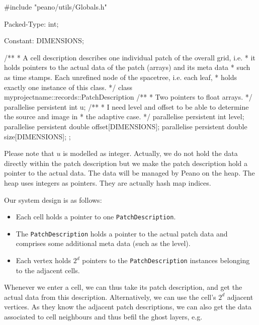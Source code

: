 \begin{code}
#include "peano/utils/Globals.h"

Packed-Type:  int;

Constant: DIMENSIONS;

/**
 * A cell description describes one individual patch of the overall grid, i.e. 
 * it holds pointers to the actual data of the patch (arrays) and its meta data
 * such as time stamps. Each unrefined node of the spacetree, i.e. each leaf, 
 * holds exactly one instance of this class. 
 */
class myprojectname::records::PatchDescription {
  /**
   * Two pointers to float arrays.
   */
  parallelise persistent int     u;
  /**
   * I need level and offset to be able to determine the source and image in 
   * the adaptive case.
   */
  parallelise persistent int     level;
  parallelise persistent double  offset[DIMENSIONS];
  parallelise persistent double  size[DIMENSIONS];
};
\end{code}

Please note that $u$ is modelled as integer. 
Actually, we do not hold the data directly within the patch description but we
make the patch description hold a pointer to the actual data.
The data will be managed by Peano on the heap. 
The heap uses integers as pointers.
They are actually hash map indices.


Our system design is as follows:
\begin{itemize}
  \item Each cell holds a pointer to one \texttt{PatchDescription}.
  \item The \texttt{PatchDescription} holds a pointer to the actual patch data
  and comprises some additional meta data (such as the level).
  \item Each vertex holds $2^d$ pointers to the
  \texttt{PatchDescription} instances belonging to the adjacent cells.
\end{itemize}


Whenever we enter a cell, we can thus take its patch description, and get the
actual data from this description.
Alternatively, we can use the cell's $2^d$ adjacent vertices. 
As they know the adjacent patch descriptions, we can also get the data
associated to cell neighbours and thus befil the ghost layers, e.g.


